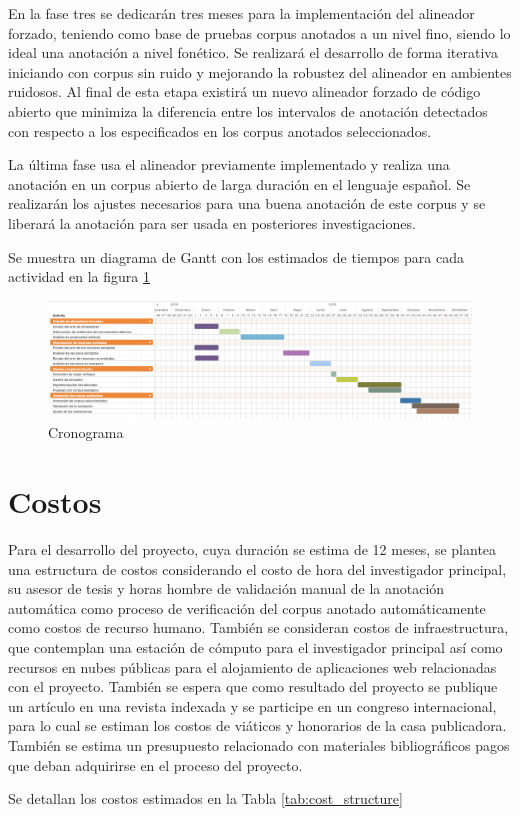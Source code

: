 En la fase tres se dedicarán tres meses para la implementación del alineador forzado, teniendo como base de pruebas corpus anotados a un nivel fino, siendo lo ideal una anotación a nivel fonético. Se realizará el desarrollo de forma iterativa iniciando con corpus sin ruido y mejorando la robustez del alineador en ambientes ruidosos. Al final de esta etapa existirá un nuevo alineador forzado de código abierto que minimiza la diferencia entre los intervalos de anotación detectados con respecto a los especificados en los corpus anotados seleccionados.

La última fase usa el alineador previamente implementado y realiza una anotación en un corpus abierto de larga duración en el lenguaje español. Se realizarán los ajustes necesarios para una buena anotación de este corpus y se liberará la anotación para ser usada en posteriores investigaciones.

Se muestra un diagrama de Gantt con los estimados de tiempos para cada actividad en la figura \ref{img:schedule}

\begin{landscape}
\begin{figure}[H]

\centering
\caption{Cronograma}
\label{img:schedule}
\includegraphics[scale=0.40]{images/schedule.png}

\end{figure}
\end{landscape}


\section{Costos}

Para el desarrollo del proyecto, cuya duración se estima de 12 meses, se plantea una estructura de costos considerando el costo de hora del investigador principal, su asesor de tesis y horas hombre de validación manual de la anotación automática como proceso de verificación del corpus anotado automáticamente como costos de recurso humano. También se consideran costos de infraestructura, que contemplan una estación de cómputo para el investigador principal así como recursos en nubes públicas para el alojamiento de aplicaciones web relacionadas con el proyecto. También se espera que como resultado del proyecto se publique un artículo en una revista indexada y se participe en un congreso internacional, para lo cual se estiman los costos de viáticos y honorarios de la casa publicadora. También se estima un presupuesto relacionado con materiales bibliográficos pagos que deban adquirirse en el proceso del proyecto. 

Se detallan los costos estimados en la Tabla \ref{tab:cost_structure}


